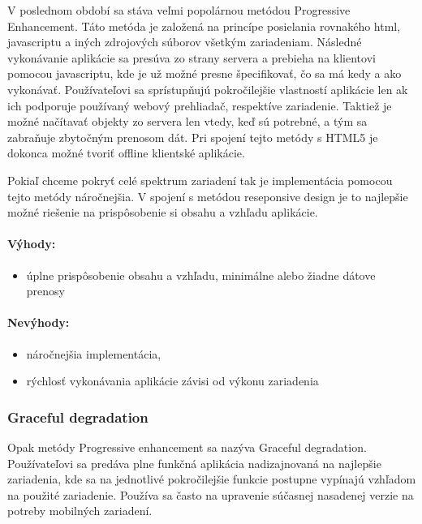 V poslednom období sa stáva veľmi popolárnou metódou Progressive Enhancement. Táto metóda je založená na princípe posielania rovnakého html, javascriptu a iných zdrojových súborov všetkým zariadeniam. Následné vykonávanie aplikácie sa presúva zo strany servera a prebieha na klientovi pomocou javascriptu, kde je už možné presne špecifikovať, čo sa má kedy a ako vykonávať. Používateľovi sa sprístupňujú pokročilejšie vlastností aplikácie len ak ich podporuje používaný webový prehliadač, respektíve zariadenie. Taktiež je možné načítavať objekty zo servera len vtedy, keď sú potrebné, a tým sa zabraňuje zbytočným prenosom dát. Pri spojení tejto metódy s HTML5 je dokonca možné tvoriť offline klientské aplikácie.

Pokiaľ chceme pokryť celé spektrum zariadení tak je implementácia pomocou tejto metódy náročnejšia. V spojení s metódou reseponsive design je to najlepšie možné riešenie na prispôsobenie si obsahu a vzhľadu aplikácie.

\paragraph{Výhody:}
\begin{itemize}
	\item úplne prispôsobenie obsahu a vzhľadu, minimálne alebo žiadne dátove prenosy
\end{itemize}

\paragraph{Nevýhody:}
\begin{itemize}
	\item náročnejšia implementácia, 
	\item rýchlosť vykonávania aplikácie závisi od výkonu zariadenia
\end{itemize}


\subsubsection{Graceful degradation} %
\label{ssub:graceful_degradation}

Opak metódy Progressive enhancement sa nazýva Graceful degradation. Používateľovi sa predáva plne funkčná aplikácia nadizajnovaná na najlepšie zariadenia, kde sa na jednotlivé pokročilejšie funkcie postupne vypínajú vzhľadom na použité zariadenie. Používa sa často na upravenie súčasnej nasadenej verzie na potreby mobilných zariadení.


